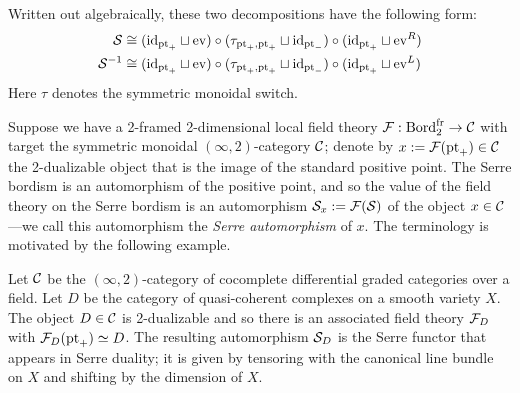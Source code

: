 \documentclass{amsart}
\begin{document}
\nid Written out algebraically, these two decompositions have the following form:
\begin{align*}
	\mathcal S &\cong (\mathrm{id}_{\mathrm{pt}_+} \sqcup \mathrm{ev}) \circ (\tau_{\mathrm{pt}_+, \mathrm{pt}_+} \sqcup \mathrm{id}_{\mathrm{pt}_-}) \circ (\mathrm{id}_{\mathrm{pt}_+} \sqcup \mathrm{ev}^R) \\
	\mathcal S^{-1} &\cong (\mathrm{id}_{\mathrm{pt}_+} \sqcup \mathrm{ev}) \circ (\tau_{\mathrm{pt}_+, \mathrm{pt}_+} \sqcup \mathrm{id}_{\mathrm{pt}_-}) \circ (\mathrm{id}_{\mathrm{pt}_+} \sqcup \mathrm{ev}^L) 
\end{align*}
Here $\tau$ denotes the symmetric monoidal switch.

Suppose we have a 2-framed 2-dimensional local field theory $\mathcal F: \mathrm{Bord}^\mathrm{fr}_2 \rightarrow \mathcal C$ with target the symmetric monoidal $(\infty,2)$-category $\mathcal C$; denote by $x:=\mathcal F(\mathrm{pt}_+) \in \mathcal C$ the 2-dualizable object that is the image of the standard positive point.  The Serre bordism is an automorphism of the positive point, and so the value of the field theory on the Serre bordism is an automorphism $\mathcal S_x := \mathcal F(\mathcal S)$ of the object $x \in \mathcal C$---we call this automorphism the \emph{Serre automorphism} of $x$.  The terminology is motivated by the following example.

\begin{example} \label{eg:serrefunctor}
Let $\mathcal C$ be the $(\infty,2)$-category of cocomplete differential graded categories over a field.  Let $D$ be the category of quasi-coherent complexes on a smooth variety $X$.  The object $D \in \mathcal C$ is 2-dualizable and so there is an associated field theory $\mathcal F_D$ with $\mathcal F_D(\mathrm{pt}_+) \simeq D$.  The resulting automorphism $\mathcal S_D$ is the Serre functor that appears in Serre duality; it is given by tensoring with the canonical line bundle on $X$ and shifting by the dimension of $X$.
\end{example} %
\end{document}
